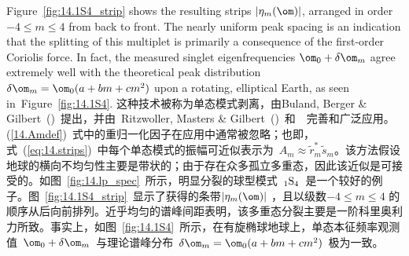 Figure~\ref{fig:14.1S4_strip} shows the resulting
strips $|\eta_m(\om)|$, arranged in order $-4\leq m\leq 4$
from back to front.  The nearly uniform peak spacing is an
indication that the splitting of this multiplet is
primarily a consequence of the first-order Coriolis force.
In fact, the measured singlet eigenfrequencies
$\om_0+\delta\om_m$ agree extremely well with the
theoretical peak distribution $\delta\om_m=\om_0(a+bm+cm^2)$
upon a rotating, elliptical Earth, as seen
in~Figure~\ref{fig:14.1S4}.
\fi
这种技术被称为单态模式剥离，由Buland, Berger \& Gilbert~(\citeyear{buland&al79})~提出，并由~Ritzwoller, Masters \& Gilbert~(\citeyear{ritzwoller&al86})~和~\textcite{widmer91}~完善和广泛应用。(\ref{14.Amdef})~式中的重归一化因子在应用中通常被忽略；也即，式~(\ref{eq:14.strips})~中每个单态模式的振幅可近似表示为~$A_m\approx
\tilde{r}_m^{*}\tilde{s}_m$。该方法假设地球的横向不均匀性主要是带状的；由于存在众多孤立多重态，因此该近似是可接受的。如图~\ref{fig:14.lp_spec}~所示，明显分裂的球型模式~${}_1{\rm S}_4$~是一个较好的例子。图~\ref{fig:14.1S4_strip}~显示了获得的条带$|\eta_m(\om)|$ ，且以级数$-4\leq m\leq 4$ 的顺序从后向前排列。近乎均匀的谱峰间距表明，该多重态分裂主要是一阶科里奥利力所致。事实上，如图~\ref{fig:14.1S4}~所示，在有旋椭球地球上，单态本征频率观测值~$\om_0+\delta\om_m$~与理论谱峰分布~$\delta\om_m=\om_0(a+bm+cm^2)$~极为一致。
%
%
